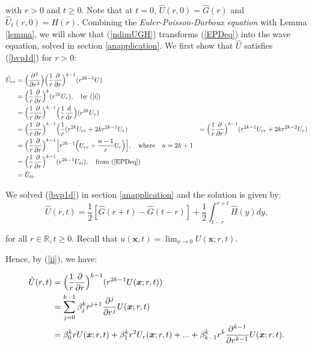 \documentclass[a4paper, 12pt]{article}
\numberwithin{equation}{section}
\begin{document}
with $r>0$ and $t \ge 0$. Note that at $t=0$, $\hat{U}(r,0)=\hat{G}(r)$ and
$\hat{U}_t(r,0)=H(r)$. Combining the \emph{Euler-Poisson-Darboux equation} with
Lemma \ref{lemma}, we will show that (\ref{ndimUGH}) transforms (\ref{EPDeq})
into the wave equation, solved in section \ref{anapplication}. We first show
that $\hat{U}$ satisfies (\ref{bvp1d}) for $r>0$:

\begin{equation*}
    \begin{aligned}
        \hat{U}_{rr}&=\Big(\diffp[2]{}{r}\Big)\Big(\frac{1}{r} \diffp[1]{}{r}\Big)^{k-1}(r^{2k-1}U)\\
        &=\Big(\frac{1}{r} \diffp[1]{}{r}\Big)^k(r^{2k}U_r), \quad \textrm{by (\ref{i})}\\
        &=\Big(\frac{1}{r} \diffp[1]{}{r}\Big)^{k-1}\Big(\frac{1}{r}\diff{}{r}\Big)(r^{2k}U_r)\\
        &=\Big(\frac{1}{r} \diffp[1]{}{r}\Big)^{k-1}\Big(\frac{1}{r}(r^{2k}U_{rr}+2kr^{2k-1}U_r)
        &=\Big(\frac{1}{r} \diffp[1]{}{r}\Big)^{k-1}(r^{2k-1}U_{rr}+2kr^{2k-2}U_r)\\
        &=\Big(\frac{1}{r} \diffp[1]{}{r}\Big)^{k-1}\Big[r^{2k-1}\Big(U_{rr}+\frac{n-1}{r}U_r\Big)\Big], \quad \textrm{where} \quad n=2k+1\\
        &=\Big(\frac{1}{r} \diffp[1]{}{r}\Big)^{k-1}(r^{2k-1}U_{tt}), \quad \textrm{from (\ref{EPDeq})}\\
        &=\hat{U}_{tt}.
    \end{aligned}
\end{equation*}

We solved (\ref{bvp1d}) in section \ref{anapplication} and the solution is given
by: 
\begin{equation}\label{nomorelabels}
    \hat{U}(r,t)=\frac{1}{2}[\hat{G}(r+t)-\hat{G}(t-r)]+\frac{1}{2}\int_{t-r}^{r+t}\hat{H}(y)dy,
\end{equation}

for all $r\in\mathbb{R}, t \ge 0$. Recall that $u(\boldsymbol{x},t)=\lim_{x
\rightarrow 0} U(\boldsymbol{x}; r, t)$.

Hence, by (\ref{ii}), we have:

\begin{equation*}
    \begin{aligned}
        \hat{U}(r,t)&=\Big(\frac{1}{r} \diffp[1]{}{r}\Big)^{k-1}(r^{2k-1}U(\boldsymbol{x};r,t))\\
        &=\sum_{j=0}^{k-1}\beta_j^k r^{j+1} \diffp[j]{}{r}U(\boldsymbol{x};r,t)\\ 
        &=\beta_0^k rU(\boldsymbol{x};r,t)+\beta_1^k r^2U_r(\boldsymbol{x};r,t)+...+\beta_{k-1}^k r^k\diffp[k-1]{}{r}U(\boldsymbol{x};r,t).
    \end{aligned}
\end{equation*}
\end{document}
